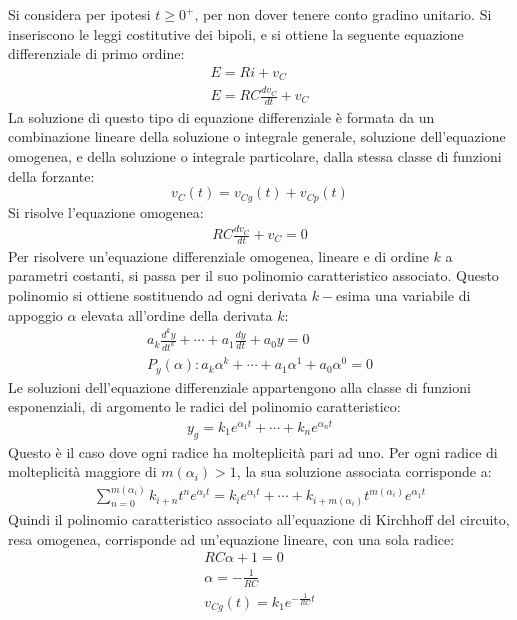 \documentclass{article}
\numberwithin{equation}{subsection}
\begin{document}
Si considera per ipotesi $t\geq0^+$, per non dover tenere conto gradino unitario. Si inseriscono le leggi costitutive dei bipoli, e si ottiene la seguente equazione 
differenziale di primo ordine:
\begin{gather*}
    E=Ri+v_C\\
    E=RC\displaystyle\frac{dv_C}{dt}+v_C
\end{gather*}
La soluzione di questo tipo di equazione differenziale è formata da un combinazione lineare della soluzione o integrale generale, soluzione dell'equazione omogenea, e 
della soluzione o integrale particolare, dalla stessa classe di funzioni della forzante:
\begin{equation*}
    v_C(t)=v_{Cg}(t)+v_{Cp}(t)
\end{equation*}
Si risolve l'equazione omogenea:
\begin{gather*}
    RC\displaystyle\frac{dv_C}{dt}+v_C=0
\end{gather*}
Per risolvere un'equazione differenziale omogenea, lineare e di ordine $k$ a parametri costanti, si passa per il suo polinomio caratteristico associato. Questo polinomio 
si ottiene sostituendo ad ogni derivata $k-$esima una variabile di appoggio $\alpha$ elevata all'ordine della derivata $k$:
\begin{gather*}
    \displaystyle a_k\frac{d^ky}{dt^k}+\cdots+a_1\frac{dy}{dt}+a_0y=0\\
    P_y(\alpha):a_k\alpha^k+\cdots+a_1\alpha^1+a_0\alpha^0=0
\end{gather*}
Le soluzioni dell'equazione differenziale appartengono alla classe di funzioni esponenziali, di argomento le radici del polinomio caratteristico:
\begin{gather*}
    y_g=k_1e^{\alpha_1t}+\cdots+k_ne^{\alpha_nt}
\end{gather*}
Questo è il caso dove ogni radice ha molteplicità pari ad uno. Per ogni radice di molteplicità maggiore di $m(\alpha_i)>1$, la sua soluzione associata corrisponde a:
\begin{gather*}
    \displaystyle\sum_{n=0}^{m(\alpha_i)}k_{i+n}t^ne^{\alpha_it}=k_ie^{\alpha_it}+\cdots+k_{i+m(\alpha_i)}t^{m(\alpha_i)}e^{\alpha_1t}
\end{gather*}
Quindi il polinomio caratteristico associato all'equazione di Kirchhoff del circuito, resa omogenea, corrisponde ad un'equazione lineare, con una sola radice:
\begin{gather*}
    RC\alpha+1=0\\
    \alpha=\displaystyle-\frac{1}{RC}\\
    v_{Cg}(t)=k_1e^{-\frac{1}{RC}t}
\end{gather*}
\end{document}
